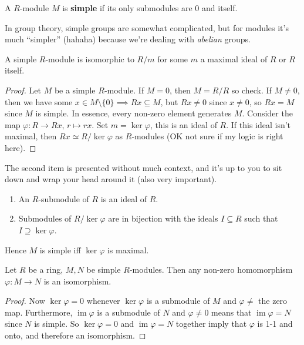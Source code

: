 \begin{definition}
    A $R$-module $M$ is \textbf{simple} if its only submodules are $0$ and itself.
\end{definition}
In group theory, simple groups are somewhat complicated, but for modules it's much ``simpler'' (hahaha) because we're dealing with \emph{abelian} groups.
\begin{prop}
    A simple $R$-module is isomorphic to $R/m$ for some $m$ a maximal ideal of $R$ or $R$ itself.
\end{prop}
\begin{proof}
    Let $M$ be a simple $R$-module. If $M=0$, then $M=R /R$ so check. If $M\neq 0$, then we have some $x\in M\setminus \{0\} \implies Rx\subseteq M$, but $Rx\neq 0$ since $x\neq 0$, so $Rx=M$ since $M$ is simple. In essence, every non-zero element generates $M$. Consider the map $\varphi  \colon R\to Rx, \, r\mapsto rx$. Set $m=\ker \varphi $, this is an ideal of $R$. If this ideal isn't maximal, then $Rx \simeq R /\ker \varphi $ as $R$-modules (OK not sure if my logic is right here).
\end{proof}
\begin{note} The second item is presented without much context, and it's up to you to sit down and wrap your head around it (also very important).
    \begin{enumerate}
        \item An $R$-submodule of $R$ is an ideal of $R$.
        \item Submodules of $R /\ker \varphi $ are in bijection with the ideals $I\subseteq R$ such that $I\supseteq \ker \varphi $.
    \end{enumerate}
    Hence $M$ is simple iff $\ker \varphi $ is maximal.
\end{note}
\begin{lemma}
   Let $R$ be a ring, $M,N$ be simple $R$-modules. Then any non-zero homomorphism $\varphi \colon M \to N$ is an isomorphism.
\end{lemma}
\begin{proof}
    Now $\ker \varphi =0$ whenever $\ker \varphi $ is a submodule of $M$ and $\varphi \neq $ the zero map. Furthermore, $\operatorname{im}\varphi $ is a submodule of $N$ and $\varphi \neq 0$ means that $\operatorname{im}\varphi =N$ since $N$ is simple. So $\ker \varphi =0$ and $\operatorname{im}\varphi =N$ together imply that $\varphi $ is 1-1 and onto, and therefore an isomorphism.
\end{proof}
